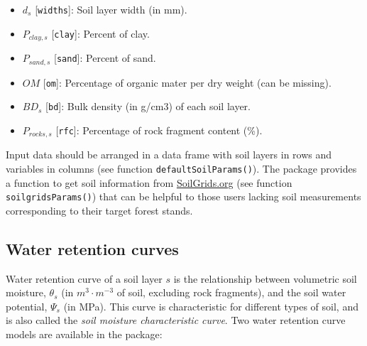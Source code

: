 \documentclass[]{book}
\providecommand{\tightlist}{%
  \setlength{\itemsep}{0pt}\setlength{\parskip}{0pt}}
\begin{document}
\begin{itemize}
\tightlist
\item
  \(d_{s}\) {[}\texttt{widths}{]}: Soil layer width (in mm).
\item
  \(P_{clay,s}\) {[}\texttt{clay}{]}: Percent of clay.
\item
  \(P_{sand,s}\) {[}\texttt{sand}{]}: Percent of sand.
\item
  \(OM\) {[}\texttt{om}{]}: Percentage of organic mater per dry weight (can be missing).
\item
  \(BD_{s}\) {[}\texttt{bd}{]}: Bulk density (in g/cm3) of each soil layer.
\item
  \(P_{rocks,s}\) {[}\texttt{rfc}{]}: Percentage of rock fragment content (\%).
\end{itemize}

Input data should be arranged in a data frame with soil layers in rows and variables in columns (see function \texttt{defaultSoilParams()}). The package provides a function to get soil information from \href{https://soilgrids.org/}{SoilGrids.org} (see function \texttt{soilgridsParams()}) that can be helpful to those users lacking soil measurements corresponding to their target forest stands.

\hypertarget{water-retention-curves}{%
\subsection{Water retention curves}\label{water-retention-curves}}

Water retention curve of a soil layer \(s\) is the relationship between volumetric soil moisture, \(\theta_s\) (in \(m^3 \cdot m^{-3}\) of soil, excluding rock fragments), and the soil water potential, \(\Psi_s\) (in MPa). This curve is characteristic for different types of soil, and is also called the \emph{soil moisture characteristic curve}. Two water retention curve models are available in the package:
\end{document}
